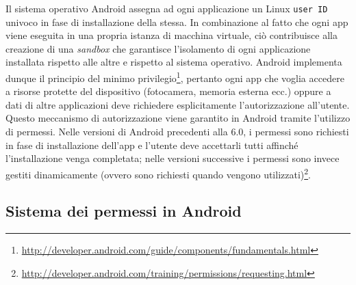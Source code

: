 \documentclass[12pt,a4paper,oneside]{article}
\begin{document}
Il sistema operativo Android assegna ad ogni applicazione un Linux \texttt{user ID} univoco in fase di installazione della stessa. In combinazione al fatto che ogni app viene eseguita in una propria istanza di macchina virtuale, ciò contribuisce alla creazione di una \textit{sandbox} che garantisce l'isolamento di ogni applicazione installata rispetto alle altre e rispetto al sistema operativo. Android implementa dunque il principio del minimo privilegio\footnote{\url{http://developer.android.com/guide/components/fundamentals.html}}, pertanto ogni app che voglia accedere a risorse protette del dispositivo (fotocamera, memoria esterna ecc.) oppure a dati di altre applicazioni deve richiedere esplicitamente l'autorizzazione all'utente. Questo meccanismo di autorizzazione viene garantito in Android tramite l'utilizzo di permessi. Nelle versioni di Android precedenti alla $6.0$, i permessi sono richiesti in fase di installazione dell'app e l'utente deve accettarli tutti affinché l'installazione venga completata; nelle versioni successive i permessi sono invece gestiti dinamicamente (ovvero sono richiesti quando vengono utilizzati)\footnote{\url{http://developer.android.com/training/permissions/requesting.html}}.



\subsection{Sistema dei permessi in Android}
\end{document}
